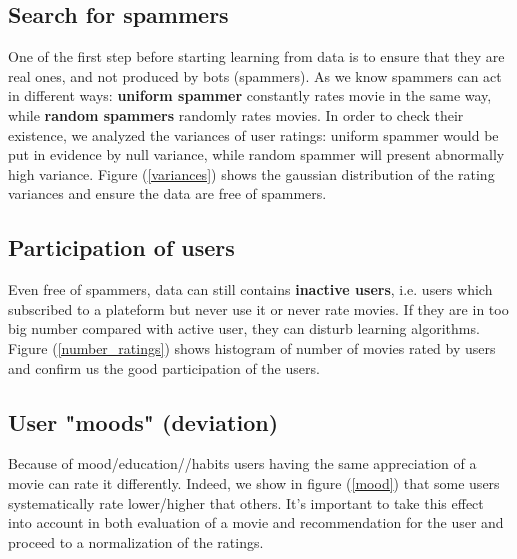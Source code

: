 \documentclass[10pt,conference,compsocconf]{IEEEtran}
\begin{document}
\subsection{Search for spammers}

One of the first step before starting learning from data is to ensure that they are real ones, and not produced by bots (spammers). As we know spammers can act in different ways: \textbf{uniform spammer} constantly rates movie in the same way, while \textbf{random spammers} randomly rates movies. In order to check their existence, we analyzed the variances of user ratings: uniform spammer would be put in evidence by null variance, while random spammer will present abnormally high variance. Figure (\ref{variances}) shows the gaussian distribution of the rating variances and ensure the data are free of spammers.

\subsection{Participation of users}

Even free of spammers, data can still contains \textbf{inactive users}, i.e. users which subscribed to a plateform but never use it or never rate movies. If they are in too big number compared with active user, they can disturb learning algorithms. Figure (\ref{number_ratings}) shows histogram of number of movies rated by users and confirm us the good participation of the users.

\subsection{User "moods" (deviation)}

Because of mood/education//habits users having the same appreciation of a movie can rate it differently. Indeed, we show in figure (\ref{mood}) that some users systematically rate lower/higher that others. It's important to take this effect into account in both evaluation of a movie and recommendation for the user and proceed to a normalization of the ratings.
\end{document}
